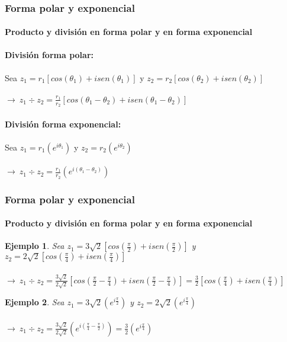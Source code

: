 \documentclass[11pt]{beamer}
\newtheorem{ejem}{Ejemplo}
\begin{document}
\begin{frame}
\frametitle{Forma polar y exponencial}
\framesubtitle{Producto y división en forma polar y en forma exponencial}
\textbf{División forma polar:}\\ \hspace{0cm} \\
Sea $z_1 = r_1[cos(\theta_1) + isen(\theta_1)]$ y $z_2 = r_2[cos(\theta_2) + isen(\theta_2)]$\\ \hspace{0cm} \\
$\rightarrow~z_1\div z_2 = \frac{r_1}{r_2}[cos(\theta_1 - \theta_2) + isen(\theta_1 - \theta_2)]$\\ \hspace{0cm} \\
\textbf{División forma exponencial:}\\ \hspace{0cm} \\
Sea $z_1 = r_1(e^{i\theta_1})$ y $z_2 = r_2(e^{i\theta_2})$\\ \hspace{0cm} \\
$\rightarrow~z_1\div z_2 = \frac{r_1}{r_2}(e^{i(\theta_1 - \theta_2)})$
\end{frame}

\begin{frame}
\frametitle{Forma polar y exponencial}
\framesubtitle{Producto y división en forma polar y en forma exponencial}
\begin{ejem}
Sea $z_1 = 3\sqrt{2}[cos(\frac{\pi}{2}) + isen(\frac{\pi}{2})]$ y $z_2 = 2\sqrt{2}[cos(\frac{\pi}{4}) + isen(\frac{\pi}{4})]$\\ \hspace{0cm} \\
$\rightarrow~z_1\div z_2 = \frac{3\sqrt{2}}{2\sqrt{2}}[cos(\frac{\pi}{2}-\frac{\pi}{4}) + isen(\frac{\pi}{2}-\frac{\pi}{4})] = 
\frac{3}{2}[cos(\frac{\pi}{4}) + isen(\frac{\pi}{4})]$
\end{ejem}
\begin{ejem}
Sea $z_1 = 3\sqrt{2}(e^{i\frac{\pi}{2}})$ y $z_2 = 2\sqrt{2}(e^{i\frac{\pi}{4}})$\\ \hspace{0cm} \\
$\rightarrow~z_1\div z_2 = \frac{3\sqrt{2}}{2\sqrt{2}}(e^{i(\frac{\pi}{4}-\frac{\pi}{2})}) = \frac{3}{2}(e^{i\frac{\pi}{4}})$
\end{ejem}
\end{frame}
\end{document}
